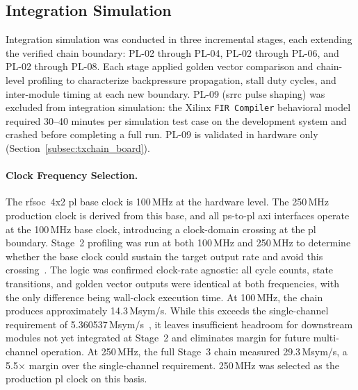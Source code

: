 
\subsection{Integration Simulation}
\label{subsec:integration_sim}

Integration simulation was conducted in three incremental stages,
each extending the verified chain boundary: PL-02 through PL-04,
PL-02 through PL-06, and PL-02 through PL-08.
Each stage applied golden vector comparison and chain-level
profiling to characterize backpressure propagation, stall duty
cycles, and inter-module timing at each new boundary.
PL-09 (\ac{srrc} pulse shaping) was excluded from integration
simulation: the Xilinx \texttt{FIR Compiler} behavioral model
required 30--40 minutes per simulation test case on the development
system and crashed before completing a full run.
PL-09 is validated in hardware only
(Section~\ref{subsec:txchain_board}).

\FloatBarrier
\paragraph{Clock Frequency Selection.}
\leavevmode\par

The \ac{rfsoc}~4x2 \ac{pl} base clock is 100\,MHz at the
hardware level.
The 250\,MHz production clock is derived from this
base, and all \ac{ps}-to-\ac{pl} \ac{axi} interfaces operate
at the 100\,MHz base clock, introducing a clock-domain crossing
at the \ac{pl} boundary.
Stage~2 profiling was run at both 100\,MHz and 250\,MHz to
determine whether the base clock could sustain the target output
rate and avoid this crossing~\cite{ITU_J83,DOCSIS3}.
The logic was confirmed clock-rate agnostic: all cycle counts,
state transitions, and golden vector outputs were identical at
both frequencies, with the only difference being wall-clock
execution time.
At 100\,MHz, the chain produces approximately 14.3\,Msym/s.
While this exceeds the single-channel requirement of
5.360537\,Msym/s~\cite{ITU_J83}, it leaves insufficient headroom
for downstream modules not yet integrated at Stage~2 and
eliminates margin for future multi-channel operation.
At 250\,MHz, the full Stage~3 chain measured 29.3\,Msym/s, a
5.5$\times$ margin over the single-channel requirement.
250\,MHz was selected as the production \ac{pl} clock on this
basis.

